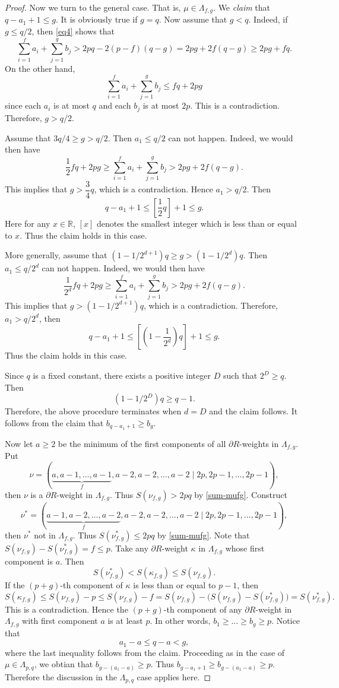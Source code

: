 \documentclass[10pt,a4paper]{amsart}
\newcommand{\bbR}{\mathbb{R}}
\begin{document}
\begin{proof}
	Now we turn to the general case. That is, $\mu\in \Lambda_{f, g}$. We \emph{claim} that $q-a_1+1\le g$. It is obviously true if $g=q$. Now assume that $g<q$.
	Indeed, if $g \le q/2$, then \eqref{eq4} shows that
	\[\sum_{i=1}^f a_i+\sum_{j=1}^g b_j>2pq-2(p-f)(q-g) = 2pg+2f(q-g)\ge 2pg+fq.\]
On the other hand,
$$
\sum_{i=1}^f a_i+\sum_{j=1}^g b_j\leq fq+2pg
$$
since each $a_i$ is at most $q$ and each $b_j$ is at most $2p$. This is a contradiction. Therefore, $g>q/2$.
	
	Assume that $3q/4\ge g>q/2$. Then $a_1\le q/2$ can not happen. Indeed, we would then have
	\[\dfrac{1}{2}fq+2pg \ge \sum_{i=1}^f a_i+\sum_{j=1}^g b_j >2pg+2f(q-g).\]
	This implies that $g>\dfrac{3}{4}q$, which is a contradiction. Hence $a_1>q/2$. Then
	\[q-a_1+1\leq\left[\dfrac{1}{2}q \right]+1\le g.\]
	Here for any $x\in\bbR$, $[x]$ denotes the smallest integer which is less than or equal to $x$. Thus the claim holds in this case.
	
	More generally, assume that $(1-1/2^{d+1})q\ge g>(1-1/2^d)q$. Then $a_1\le q/2^d$ can not happen. Indeed, we would then have
	\[\dfrac{1}{2^{d}}fq+2pg\ge \sum_{i=1}^f a_i+\sum_{j=1}^g b_j>2pg+2f(q-g).\]
	This implies that
	$g>(1-1/2^{d+1})q$, which is a contradiction.
	Therefore, $a_1>q/2^{d}$, then
	\[q-a_1+1\le \left[(1-\dfrac{1}{2^d})q \right]+1\le g.\]
	Thus the claim holds in this case.

Since $q$ is a fixed constant, there exists a positive integer $D$ such that $2^D\ge q$. Then
$$
(1-1/2^D)q\ge q-1.
$$
Therefore, the above procedure terminates when $d=D$ and the claim follows. It follows from the claim that $b_{q-a_1+1}\ge b_g$.
	
	Now let $a\ge 2$ be the minimum of the first components of all $\partial R$-weights in $\Lambda_{f,g}$. Put
	\[\nu=(\underbrace{a,a-1,\dots,a-1}_{f},a-2,a-2,\dots,a-2 \mid 2p,2p-1,\dots,2p-1),\]
	then $\nu$ is a $\partial R$-weight in $\Lambda_{f,g}$. Thus $S(\nu_{f, g})>2pq$ by \eqref{sum-mufg}. Construct
	\[\nu^*=(\underbrace{a-1,a-2,\dots,a-2}_{f},a-2,a-2,\dots,a-2 \mid 2p,2p-1,\dots,2p-1),\]
	then $\nu^*$ not in $\Lambda_{f,g}$. Thus $S(\nu_{f, g}^*)\leq 2pq$ by \eqref{sum-mufg}. Note that $S(\nu_{f,g})-S(\nu_{f,g}^*) = f\le p$. Take any $\partial R$-weight $\kappa$ in $\Lambda_{f,g}$ whose first component is $a$. Then
	\[S(\nu^*_{f,g}) < S(\kappa_{f,g}) \le S(\nu_{f,g}).\]
If the $(p+g)$-th component of $\kappa$ is less than or equal to $p-1$, then
\[S(\kappa_{f, g})\leq S(\nu_{f,g})-p\leq S(\nu_{f,g})-f=S(\nu_{f,g})-\big(S(\nu_{f,g})-S(\nu_{f,g}^*)\big)=S(\nu_{f,g}^*).\]
This is a contradiction. Hence the $(p+g)$-th component of any $\partial R$-weight in $\Lambda_{f,g}$ with first component $a$ is at least $p$. In other words, $b_1\ge \dots \ge b_g\ge p$.  Notice that
	\[a_1-a\le q-a< g,\]
where the last inequality follows from the claim.
Proceeding as in the case of $\mu\in \Lambda_{p, q}$, we obtian that $b_{g-(a_1-a)}\ge p$. Thus $b_{g-a_1+1}\ge b_{g-(a_1-a)}\ge p$. Therefore the discussion in the $\Lambda_{p, q}$ case applies here.
\end{proof}
\end{document}
